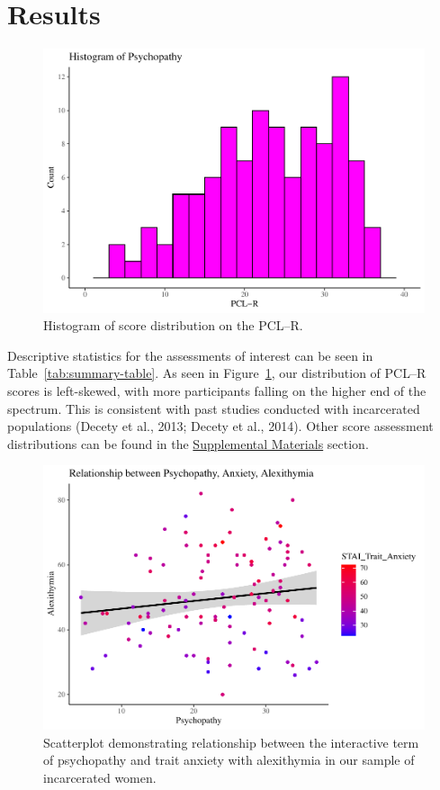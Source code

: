 \documentclass[
  man,floatsintext]{apa7}
\begin{document}
\hypertarget{results}{%
\section{Results}\label{results}}



\begin{figure}
\includegraphics[width=1\linewidth]{d2m-Psychopathy_files/figure-latex/PCLR-descriptives-1} \caption{Histogram of score distribution on the PCL--R.}\label{fig:PCLR-descriptives}
\end{figure}

Descriptive statistics for the assessments of interest can be seen in Table~\ref{tab:summary-table}. As seen in Figure~\ref{fig:PCLR-descriptives}, our distribution of PCL--R scores is left-skewed, with more participants falling on the higher end of the spectrum. This is consistent with past studies conducted with incarcerated populations (Decety et al., 2013; Decety et al., 2014). Other score assessment distributions can be found in the \protect\hyperlink{Supplemental-Materials}{Supplemental Materials} section.



\begin{figure}
\includegraphics[width=1\linewidth]{d2m-Psychopathy_files/figure-latex/c-path-scatterplot-1} \caption{Scatterplot demonstrating relationship between the interactive term of psychopathy and trait anxiety with alexithymia in our sample of incarcerated women.}\label{fig:c-path-scatterplot}
\end{figure}
\end{document}
